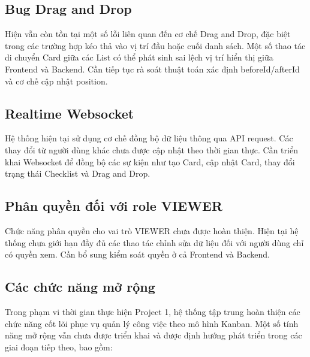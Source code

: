 \subsection{Bug Drag and Drop}

Hiện vẫn còn tồn tại một số lỗi liên quan đến cơ chế Drag and Drop,
đặc biệt trong các trường hợp kéo thả vào vị trí đầu hoặc cuối danh sách.
Một số thao tác di chuyển Card giữa các List có thể phát sinh sai lệch vị
trí hiển thị giữa Frontend và Backend. Cần tiếp tục rà soát thuật toán xác
định beforeId/afterId và cơ chế cập nhật position.

\subsection{Realtime Websocket}

Hệ thống hiện tại sử dụng cơ chế đồng bộ dữ liệu thông qua API request.
Các thay đổi từ người dùng khác chưa được cập nhật theo thời gian thực.
Cần triển khai Websocket để đồng bộ các sự kiện như tạo Card, cập nhật
Card, thay đổi trạng thái Checklist và Drag and Drop.

\subsection{Phân quyền đối với role VIEWER}

Chức năng phân quyền cho vai trò VIEWER chưa được hoàn thiện.
Hiện tại hệ thống chưa giới hạn đầy đủ các thao tác chỉnh sửa dữ liệu đối
với người dùng chỉ có quyền xem. Cần bổ sung kiểm soát quyền ở cả Frontend
và Backend.

\subsection{Các chức năng mở rộng}

Trong phạm vi thời gian thực hiện Project 1, hệ thống tập trung hoàn thiện các
chức năng cốt lõi phục vụ quản lý công việc theo mô hình Kanban. Một số
tính năng mở rộng vẫn chưa được triển khai và được định hướng phát triển
trong các giai đoạn tiếp theo, bao gồm:

